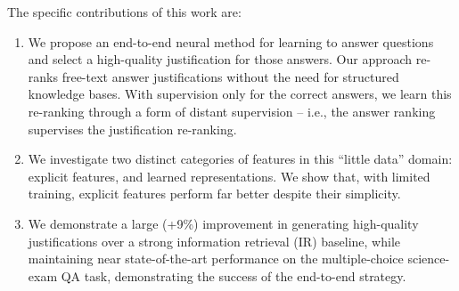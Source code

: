 The specific contributions of this work are:
\begin{enumerate}
\item We propose an end-to-end neural method for learning to answer questions and select a high-quality justification for those answers. 
Our approach re-ranks free-text answer justifications without the need for structured knowledge bases. 
With supervision only for the correct answers, we learn this re-ranking through a form of distant supervision -- i.e., the answer ranking supervises the justification re-ranking. 

\item We investigate two distinct categories of features in this ``little data'' domain: explicit features, and learned representations. We show that, with limited training, explicit features perform far better despite their simplicity. 

\item We demonstrate a large (+9\%) improvement in generating high-quality justifications over a strong information retrieval (IR) baseline, while maintaining near state-of-the-art performance on the multiple-choice science-exam QA task, demonstrating the success of the end-to-end strategy.
\end{enumerate}
